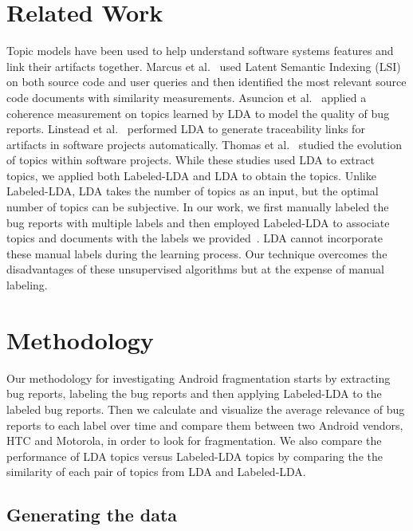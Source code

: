 \documentclass[10pt, conference, compsocconf]{IEEEtran}
\begin{document}
\section{Related Work}
\label{sec:relatedwork}
Topic models have been used to help understand software systems
features and link their artifacts together.
Marcus et al.~\cite{Marcus04aninformation} used Latent Semantic
Indexing (LSI) on both source code and user queries and then
identified the most relevant source code documents with similarity
measurements. 
Asuncion et al.~\cite{Asuncion:2010} applied a coherence measurement
on topics learned by LDA to model the quality of bug reports. 
Linstead et al.~\cite{Linstead:2009} performed LDA to generate
traceability links for artifacts in software projects automatically. 
Thomas et al.~\cite{Thomas:2011} studied
the evolution of topics within software projects.
While these studies used 
 LDA to extract topics,  we applied both Labeled-LDA and LDA to
obtain the topics. 
Unlike Labeled-LDA, LDA takes the number of topics as an input, but
the optimal number of topics can be subjective.
In our work, we first manually labeled the bug reports with multiple
labels and then employed
Labeled-LDA to associate topics and documents with the labels we
provided~\cite{labeledlda}. 
LDA cannot incorporate these manual labels during the learning process.
Our technique overcomes the disadvantages of these unsupervised
algorithms but at the expense of manual labeling.



\section{Methodology}
\label{sec:methodology}

Our methodology for investigating Android fragmentation starts by extracting
bug reports, labeling the bug reports and then applying
Labeled-LDA to the labeled bug reports.
Then 
 we calculate and visualize the average relevance of bug reports to each label
over time and compare them between two Android vendors,
HTC and Motorola, in order to look for fragmentation.
We also compare the performance of LDA topics versus
Labeled-LDA topics by comparing the 
the similarity of each pair of
topics from LDA and Labeled-LDA.

\subsection{Generating the data}
\end{document}
